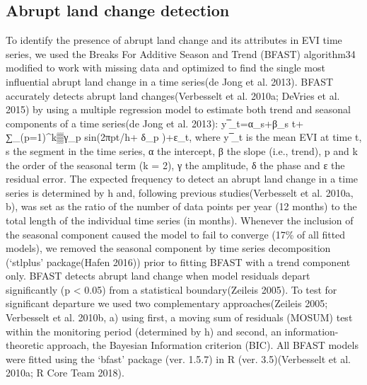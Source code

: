 \subsection{Abrupt land change detection} 
To identify the presence of abrupt land change and its attributes in EVI time series, we used the Breaks For Additive Season and Trend (BFAST) algorithm34 modified to work with missing data and optimized to find the single most influential abrupt land change in a time series(de Jong et al. 2013). BFAST accurately detects abrupt land changes(Verbesselt et al. 2010a; DeVries et al. 2015) by using a multiple regression model to estimate both trend and seasonal components of a time series(de Jong et al. 2013):  y ̅_t=α_s+β_s t+ ∑_(p=1)^k▒γ_p   sin⁡(2πpt/h+ δ_p )+ε_t, where y ̅_t is the mean EVI at time t, s the segment in the time series, α the intercept, β the slope (i.e., trend), p and k the order of the seasonal term (k = 2), γ the amplitude, δ the phase and ε the residual error. The expected frequency to detect an abrupt land change in a time series is determined by h and, following previous studies(Verbesselt et al. 2010a, b), was set as the ratio of the number of data points per year (12 months) to the total length of the individual time series (in months). Whenever the inclusion of the seasonal component caused the model to fail to converge (17\% of all fitted models), we removed the seasonal component by time series decomposition (‘stlplus’ package(Hafen 2016)) prior to fitting BFAST with a trend component only. BFAST detects abrupt land change when model residuals depart significantly (p < 0.05) from a statistical boundary(Zeileis 2005). To test for significant departure we used two complementary approaches(Zeileis 2005; Verbesselt et al. 2010b, a) using first, a moving sum of residuals (MOSUM) test within the monitoring period (determined by h) and second, an information-theoretic approach, the Bayesian Information criterion (BIC). All BFAST models were fitted using the ‘bfast’ package (ver. 1.5.7) in R (ver. 3.5)(Verbesselt et al. 2010a; R Core Team 2018).


